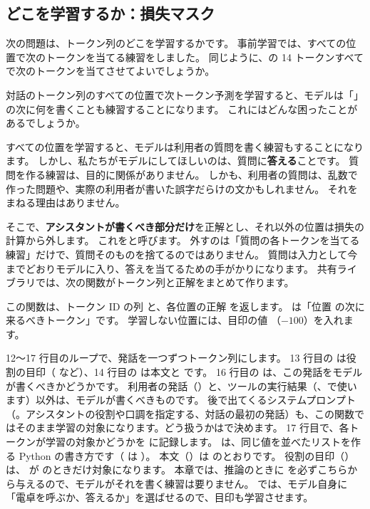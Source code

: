 \subsection{どこを学習するか：損失マスク}

次の問題は、トークン列のどこを学習するかです。
事前学習では、すべての位置で次のトークンを当てる練習をしました。
同じように、の 14 トークンすべてで次のトークンを当てさせてよいでしょうか。

\begin{quiz}
対話のトークン列のすべての位置で次トークン予測を学習すると、モデルは「」の次に何を書くことも練習することになります。
これにはどんな困ったことがあるでしょうか。
\end{quiz}

すべての位置を学習すると、モデルは利用者の質問を書く練習もすることになります。
しかし、私たちがモデルにしてほしいのは、質問に\textbf{答える}ことです。
質問を作る練習は、目的に関係がありません。
しかも、利用者の質問は、乱数で作った問題や、実際の利用者が書いた誤字だらけの文かもしれません。
それをまねる理由はありません。

そこで、\textbf{アシスタントが書くべき部分だけ}を正解とし、それ以外の位置は損失の計算から外します。
これをと呼びます。
外すのは「質問の各トークンを当てる練習」だけで、質問そのものを捨てるのではありません。
質問は入力として今までどおりモデルに入り、答えを当てるための手がかりになります。
共有ライブラリでは、次の関数がトークン列と正解をまとめて作ります。


この関数は、トークン ID の列  と、各位置の正解  を返します。
 は「位置  の次に来るべきトークン」です。
学習しない位置には、目印の値 （$-100$）を入れます。

12〜17 行目のループで、発話を一つずつトークン列にします。
13 行目の  は役割の目印（ など）、14 行目の  は本文と  です。
16 行目の  は、この発話をモデルが書くべきかどうかです。
利用者の発話（）と、ツールの実行結果（、で使います）以外は、モデルが書くべきものです。
後で出てくるシステムプロンプト（。アシスタントの役割や口調を指定する、対話の最初の発話）も、この関数ではそのまま学習の対象になります。どう扱うかはで決めます。
17 行目で、各トークンが学習の対象かどうかを  に記録します。
 は、同じ値を並べたリストを作る Python の書き方です（ は ）。
本文（）は  のとおりです。
役割の目印（）は、 が  のときだけ対象になります。
本章では、推論のときに  を必ずこちらから与えるので、モデルがそれを書く練習は要りません。
では、モデル自身に「電卓を呼ぶか、答えるか」を選ばせるので、目印も学習させます。

